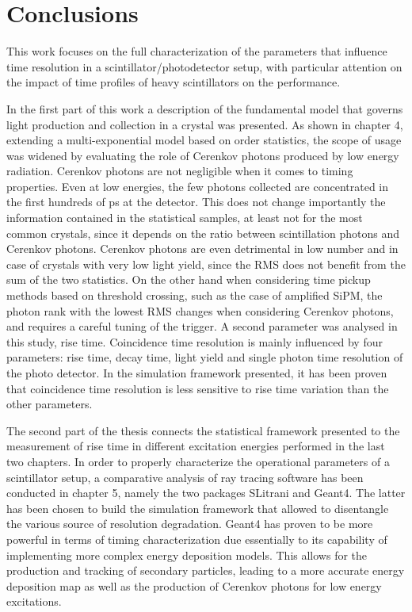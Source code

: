 \chapter{Conclusions}

This work focuses on the full characterization of the parameters that influence time resolution in a scintillator/photodetector setup, with particular attention on the impact of time profiles of heavy scintillators on the performance.

In the first part of this work a description of the fundamental model that governs light production and collection in a crystal was presented.
As shown in chapter 4, extending a multi-exponential model based on order statistics, the scope of usage was widened by evaluating the role of Cerenkov photons produced by low energy radiation.
Cerenkov photons are not negligible when it comes to timing properties. Even at low energies, the few photons collected are concentrated in the first hundreds of ps at the detector. This does not change importantly the information contained in the statistical samples, at least not for the most common crystals, since it depends on the ratio between scintillation photons and Cerenkov photons. Cerenkov photons are even detrimental in low number and in case of crystals with very low light yield, since the RMS does not benefit from the sum of the two statistics. 
On the other hand when considering time pickup methods based on threshold crossing, such as the case of amplified SiPM, the photon rank with the lowest RMS changes when considering Cerenkov photons, and requires a careful tuning of the trigger.
A second parameter was analysed in this study, rise time. Coincidence time resolution is mainly influenced by four parameters: rise time, decay time, light yield and single photon time resolution of the photo detector. In the simulation framework presented, it has been proven that coincidence time resolution is less sensitive to rise time variation than the other parameters.
 
The second part of the thesis connects the statistical framework presented to the measurement of rise time in different excitation energies performed in the last two chapters. 
In order to properly characterize the operational parameters of a scintillator setup, a comparative analysis of ray tracing software has been conducted in chapter 5, namely the two packages SLitrani and Geant4. The latter has been chosen to build the simulation framework that allowed to disentangle the various source of resolution degradation. Geant4 has proven to be more powerful in terms of timing characterization due essentially to its capability of implementing more complex energy deposition models. This allows for the production and tracking of secondary particles, leading to a more accurate energy deposition map as well as the production of Cerenkov photons for low energy excitations.

